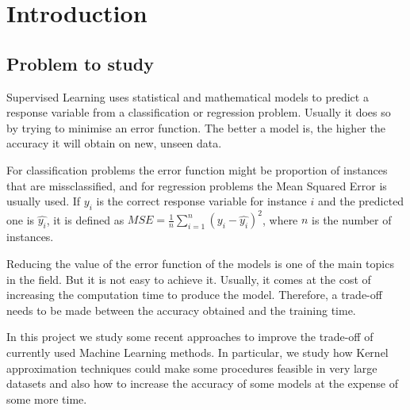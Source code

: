 
\chapter{Introduction} %

\label{Chapter1} %




\section{Problem to study}

\begin{pre-delivery}
  Supervised Learning uses statistical and mathematical models to predict a
  response variable from a classification or regression problem. Usually it does
  so by trying to minimise an error function.
  The better a model is, the higher the accuracy it will obtain on new, unseen
  data.

  For classification problems the error function might be proportion of
  instances that are missclassified, and for regression problems the Mean
  Squared Error is usually used. If $y_i$ is the correct response variable for
  instance $i$ and the predicted one is $\hat{y_i}$, it is defined as
  $MSE = \frac{1}{n} \sum_{i = 1}^n (y_i - \hat{y_i})^2$, where $n$ is the
  number of instances.

  Reducing the value of the error function
  of the models is one of the main topics in the field.
  But it is not easy to achieve it. Usually, it comes at the cost of increasing the
  computation time to produce the model. Therefore, a trade-off needs to be
  made between the accuracy obtained and the training time.

  In this project we study some recent approaches to improve the trade-off of
  currently used Machine Learning methods. In particular, we study how
  Kernel approximation techniques could make some procedures feasible in
  very large datasets and also how to increase the accuracy of some models
  at the expense of some more time.
\end{pre-delivery}

